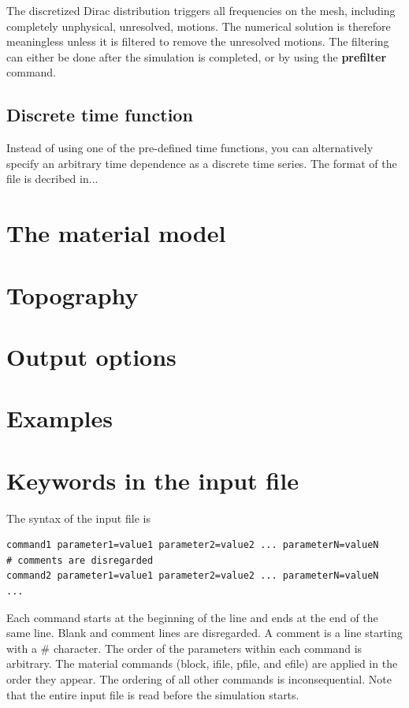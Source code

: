 \documentclass[11pt]{report}
\begin{document}
The discretized Dirac distribution triggers all frequencies on the mesh, including completely
unphysical, unresolved, motions. The numerical solution is therefore meaningless unless it is filtered
to remove the unresolved motions. The filtering can either be done after the simulation is completed,
or by using the {\bf prefilter} command.

\section{Discrete time function}
Instead of using one of the pre-defined time functions, you can alternatively specify an arbitrary
time dependence as a discrete time series. The format of the file is decribed in...

\chapter{The material model}
\chapter{Topography} \label{sec:topography}
\chapter{Output options}
\chapter{Examples} \label{sec:examples}

\chapter{Keywords in the input file}\label{chap:keywords}
The syntax of the input file is
\begin{verbatim}
command1 parameter1=value1 parameter2=value2 ... parameterN=valueN
# comments are disregarded
command2 parameter1=value1 parameter2=value2 ... parameterN=valueN
...
\end{verbatim}
Each command starts at the beginning of the line and ends at the end of the same line. Blank and
comment lines are disregarded. A comment is a line starting with a \# character. The order of the
parameters within each command is arbitrary. The material commands (block, ifile, pfile, and efile)
are applied in the order they appear. The ordering of all other commands is inconsequential. Note
that the entire input file is read before the simulation starts.
\end{document}
